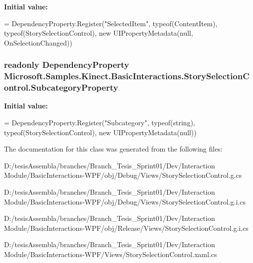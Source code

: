 {\bfseries Initial value\-:}
\begin{DoxyCode}
=
            DependencyProperty.Register(\textcolor{stringliteral}{"SelectedItem"}, typeof(ContentItem), typeof(StorySelectionControl),
       \textcolor{keyword}{new} UIPropertyMetadata(null, OnSelectionChanged))
\end{DoxyCode}
\hypertarget{class_microsoft_1_1_samples_1_1_kinect_1_1_basic_interactions_1_1_story_selection_control_a8dd827f34e811d4f3db88e6aa0c778f6}{
\subsubsection[{Subcategory\-Property}]{\setlength{\rightskip}{0pt plus 5cm}readonly Dependency\-Property Microsoft.\-Samples.\-Kinect.\-Basic\-Interactions.\-Story\-Selection\-Control.\-Subcategory\-Property\hspace{0.3cm}{\ttfamily [static]}}}\label{class_microsoft_1_1_samples_1_1_kinect_1_1_basic_interactions_1_1_story_selection_control_a8dd827f34e811d4f3db88e6aa0c778f6}
{\bfseries Initial value\-:}
\begin{DoxyCode}
=
            DependencyProperty.Register(\textcolor{stringliteral}{"Subcategory"}, typeof(\textcolor{keywordtype}{string}), typeof(StorySelectionControl), \textcolor{keyword}{new} 
      UIPropertyMetadata(null))
\end{DoxyCode}


The documentation for this class was generated from the following files\-:\begin{DoxyCompactItemize}
\item 
D\-:/tesis\-Assembla/branches/\-Branch\-\_\-\-Tesis\-\_\-\-Sprint01/\-Dev/\-Interaction Module/\-Basic\-Interactions-\/\-W\-P\-F/obj/\-Debug/\-Views/Story\-Selection\-Control.\-g.\-cs\item 
D\-:/tesis\-Assembla/branches/\-Branch\-\_\-\-Tesis\-\_\-\-Sprint01/\-Dev/\-Interaction Module/\-Basic\-Interactions-\/\-W\-P\-F/obj/\-Debug/\-Views/Story\-Selection\-Control.\-g.\-i.\-cs\item 
D\-:/tesis\-Assembla/branches/\-Branch\-\_\-\-Tesis\-\_\-\-Sprint01/\-Dev/\-Interaction Module/\-Basic\-Interactions-\/\-W\-P\-F/obj/\-Release/\-Views/Story\-Selection\-Control.\-g.\-i.\-cs\item 
D\-:/tesis\-Assembla/branches/\-Branch\-\_\-\-Tesis\-\_\-\-Sprint01/\-Dev/\-Interaction Module/\-Basic\-Interactions-\/\-W\-P\-F/\-Views/Story\-Selection\-Control.\-xaml.\-cs\end{DoxyCompactItemize}
